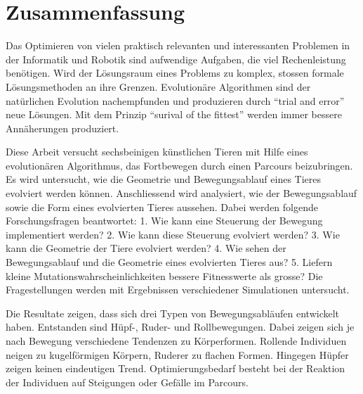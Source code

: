 %
%


\chapter{Zusammenfassung}

  Das Optimieren von vielen praktisch relevanten und interessanten Problemen
  in der Informatik und Robotik sind aufwendige Aufgaben, die viel Rechenleistung benötigen.
  Wird der Lösungsraum eines Problems zu komplex, stossen formale Lösungsmethoden an ihre Grenzen.
  Evolutionäre Algorithmen sind der natürlichen Evolution nachempfunden und
  produzieren durch ``trial and error'' neue Lösungen.
  Mit dem Prinzip ``surival of the fittest'' werden immer bessere Annäherungen produziert.

  \smallskip

  Diese Arbeit versucht sechsbeinigen künstlichen Tieren mit Hilfe eines evolutionären Algorithmus,
  das Fortbewegen durch einen Parcours beizubringen.
  Es wird untersucht, wie die Geometrie und Bewegungsablauf eines Tieres evolviert werden können.
  Anschliessend wird analysiert, wie der Bewegungsablauf sowie die Form eines evolvierten Tieres aussehen.
  Dabei werden folgende Forschungsfragen beantwortet:
  1. Wie kann eine Steuerung der Bewegung implementiert werden?
  2. Wie kann diese Steuerung evolviert werden?
  3. Wie kann die Geometrie der Tiere evolviert werden?
  4. Wie sehen der Bewegungsablauf und die Geometrie eines evolvierten Tieres aus?
  5. Liefern kleine Mutationswahrscheinlichkeiten bessere Fitnesswerte als grosse?
  Die Fragestellungen werden mit Ergebnissen verschiedener Simulationen untersucht.

  \smallskip

  Die Resultate zeigen, dass sich drei Typen von Bewegungsabläufen entwickelt haben.
  Entstanden sind Hüpf-, Ruder- und Rollbewegungen.
  Dabei zeigen sich je nach Bewegung verschiedene Tendenzen zu Körperformen.
  Rollende Individuen neigen zu kugelförmigen Körpern, Ruderer zu flachen Formen.
  Hingegen Hüpfer zeigen keinen eindeutigen Trend.
  Optimierungsbedarf besteht bei der Reaktion der Individuen auf Steigungen oder Gefälle im Parcours.
